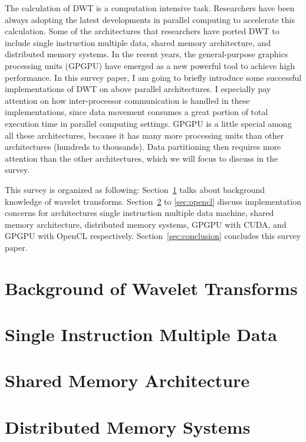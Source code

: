 \documentclass{article}
\begin{document}
The calculation of DWT is a computation intensive task.
%
Researchers have been always adopting the latest developments in 
parallel computing to accelerate this calculation.
%
Some of the architectures that researchers have ported DWT to
include single instruction multiple data, shared memory architecture,
and distributed memory systems.
%
In the recent years, the general-purpose graphics processing units
(GPGPU) have emerged as a new powerful tool to achieve high performance.
%
In this survey paper, I am going to briefly introduce some successful
implementations of DWT on above parallel architectures.
%
I especially pay attention on how inter-processor communication is handled
in these implementations, since data movement consumes a great portion 
of total execution time in parallel computing settings.
%
GPGPU is a little special among all these architectures, because it has 
many more processing units than other architectures (hundreds to thousands).
%
Data partitioning then requires more attention than the other architectures, 
which we will focus to discuss in the survey.


This survey is organized as following:
Section~\ref{sec:bg} talks about background knowledge of wavelet transforms.
%
Section~\ref{sec:simd} to \ref{sec:opencl} discuss implementation concerns for
architectures single instruction multiple data machine, shared memory architecture,
distributed memory systems, GPGPU with CUDA, and GPGPU with OpenCL respectively.
%
Section~\ref{sec:conclusion} concludes this survey paper.


\section{Background of Wavelet Transforms}
\label{sec:bg}


\section{Single Instruction Multiple Data}
\label{sec:simd}


\section{Shared Memory Architecture}
\label{sec:sma}


\section{Distributed Memory Systems}
\label{sec:dma}

\end{document}
